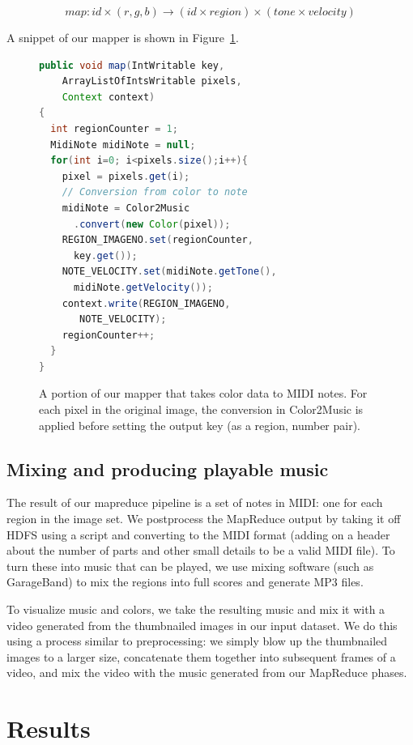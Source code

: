 \documentclass[10pt, conference, compsocconf]{IEEEtran}
\newcommand{\code}[1]{\textsf{\small #1}}
\begin{document}
\[
  map : id \times (r,g,b) \to (id \times region) \times (tone \times velocity)
\]

A snippet of our mapper is shown in
Figure~\ref{figure:colortomusic-mapper}.  

\begin{figure}
\label{figure:colortomusic-mapper}
\begin{lstlisting}[language=Java]
public void map(IntWritable key, 
    ArrayListOfIntsWritable pixels,
    Context context)
{
  int regionCounter = 1;
  MidiNote midiNote = null;
  for(int i=0; i<pixels.size();i++){
    pixel = pixels.get(i);
    // Conversion from color to note
    midiNote = Color2Music
      .convert(new Color(pixel));
    REGION_IMAGENO.set(regionCounter,
      key.get());
    NOTE_VELOCITY.set(midiNote.getTone(),
      midiNote.getVelocity());
    context.write(REGION_IMAGENO,
       NOTE_VELOCITY);
    regionCounter++;
  }
}
\end{lstlisting}
\caption{A portion of our mapper that takes color data to MIDI notes.
  For each pixel in the original image, the conversion in
  \code{Color2Music} is applied before setting the output key (as a
  region, number pair).}
\end{figure}



\subsection{Mixing and producing playable music}

The result of our mapreduce pipeline is a set of notes in MIDI: one
for each region in the image set.  We postprocess the MapReduce output
by taking it off HDFS using a script and converting to the MIDI format
(adding on a header about the number of parts and other small details
to be a valid MIDI file). To turn these into music that can be played,
we use mixing software (such as GarageBand) to mix the regions into
full scores and generate MP3 files.

To visualize music and colors, we take the resulting music and mix it
with a video generated from the thumbnailed images in our input
dataset.  We do this using a process similar to preprocessing: we
simply blow up the thumbnailed images to a larger size, concatenate
them together into subsequent frames of a video, and mix the video
with the music generated from our MapReduce phases.

\section{Results}
\end{document}

